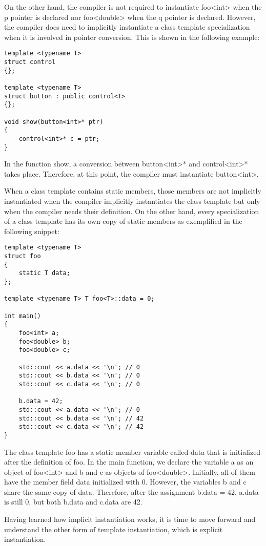 On the other hand, the compiler is not required to instantiate foo<int> when the p pointer is declared nor foo<double> when the q pointer is declared. However, the compiler does need to implicitly instantiate a class template specialization when it is involved in pointer conversion. This is shown in the following example:

\begin{lstlisting}[style=styleCXX]
template <typename T>
struct control
{};

template <typename T>
struct button : public control<T>
{};

void show(button<int>* ptr)
{
	control<int>* c = ptr;
}
\end{lstlisting}

In the function show, a conversion between button<int>* and control<int>* takes place. Therefore, at this point, the compiler must instantiate button<int>.

When a class template contains static members, those members are not implicitly instantiated when the compiler implicitly instantiates the class template but only when the compiler needs their definition. On the other hand, every specialization of a class template has its own copy of static members as exemplified in the following snippet:

\begin{lstlisting}[style=styleCXX]
template <typename T>
struct foo
{
	static T data;
};

template <typename T> T foo<T>::data = 0;

int main()
{
	foo<int> a;
	foo<double> b;
	foo<double> c;
	
	std::cout << a.data << '\n'; // 0
	std::cout << b.data << '\n'; // 0
	std::cout << c.data << '\n'; // 0
	
	b.data = 42;
	std::cout << a.data << '\n'; // 0
	std::cout << b.data << '\n'; // 42
	std::cout << c.data << '\n'; // 42
}
\end{lstlisting}

The class template foo has a static member variable called data that is initialized after the definition of foo. In the main function, we declare the variable a as an object of foo<int> and b and c as objects of foo<double>. Initially, all of them have the member field data initialized with 0. However, the variables b and c share the same copy of data. Therefore, after the assignment b.data = 42, a.data is still 0, but both b.data and c.data are 42.

Having learned how implicit instantiation works, it is time to move forward and understand the other form of template instantiation, which is explicit instantiation.

